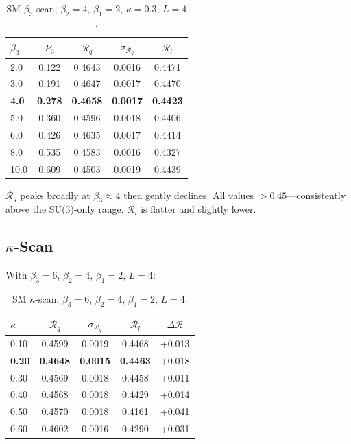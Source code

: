 \documentclass[12pt,a4paper]{article}
\newcommand{\R}{\mathcal{R}}           %
\theoremstyle{plain}
\theoremstyle{definition}
\theoremstyle{remark}
\begin{document}
\begin{table}[ht]
\centering
\caption{SM $\beta_3$-scan, $\beta_2=4$, $\beta_1=2$, $\kappa=0.3$, $L=4$.}
\label{tab:sm_bscan}
\begin{tabular}{lcccc}
\toprule
$\beta_3$ & $\bar{P}_3$ & $\R_q$ & $\sigma_{\R_q}$ & $\R_l$ \\
\midrule
 2.0 & 0.122 & 0.4643 & 0.0016 & 0.4471 \\
 3.0 & 0.191 & 0.4647 & 0.0017 & 0.4470 \\
\textbf{4.0} & \textbf{0.278} & \textbf{0.4658} & \textbf{0.0017} & \textbf{0.4423} \\
 5.0 & 0.360 & 0.4596 & 0.0018 & 0.4406 \\
 6.0 & 0.426 & 0.4635 & 0.0017 & 0.4414 \\
 8.0 & 0.535 & 0.4583 & 0.0016 & 0.4327 \\
10.0 & 0.609 & 0.4503 & 0.0019 & 0.4439 \\
\bottomrule
\end{tabular}
\end{table}

$\R_q$ peaks broadly at $\beta_3\approx4$ then gently declines.
All values $>0.45$---consistently above the SU(3)-only range.
$\R_l$ is flatter and slightly lower.

\subsection{$\kappa$-Scan}

With $\beta_3=6$, $\beta_2=4$, $\beta_1=2$, $L=4$:

\begin{table}[ht]
\centering
\caption{SM $\kappa$-scan, $\beta_3=6$, $\beta_2=4$, $\beta_1=2$, $L=4$.}
\label{tab:sm_kscan}
\begin{tabular}{lcccc}
\toprule
$\kappa$ & $\R_q$ & $\sigma_{\R_q}$ & $\R_l$ & $\Delta\R$ \\
\midrule
0.10 & 0.4599 & 0.0019 & 0.4468 & +0.013 \\
\textbf{0.20} & \textbf{0.4648} & \textbf{0.0015} & \textbf{0.4463} & +0.018 \\
0.30 & 0.4569 & 0.0018 & 0.4458 & +0.011 \\
0.40 & 0.4568 & 0.0018 & 0.4429 & +0.014 \\
0.50 & 0.4570 & 0.0018 & 0.4161 & +0.041 \\
0.60 & 0.4602 & 0.0016 & 0.4290 & +0.031 \\
\bottomrule
\end{tabular}
\end{table}
\end{document}
